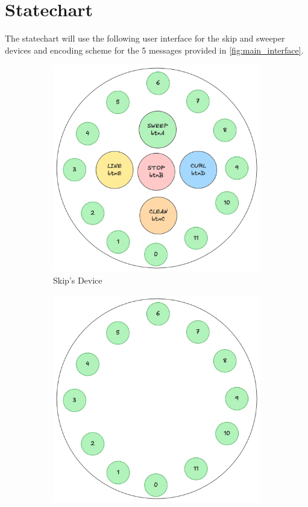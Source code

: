 \documentclass{article}
\begin{document}
\section{Statechart}
The statechart will use the following user interface for the skip and sweeper devices and encoding scheme for the 5 messages provided in \autoref{fig:main_interface}. 
\begin{figure}[ht!]
    \centering
    \begin{subfigure}{0.2\textwidth}
        \centering
        \includegraphics[width=\textwidth]{ui.png}
        \caption{Skip's Device}
    \end{subfigure}
    \begin{subfigure}{0.2\textwidth}
        \centering
        \includegraphics[width=\textwidth]{sweeper_ui.png}

\end{subfigure}
\end{figure}
\end{document}
